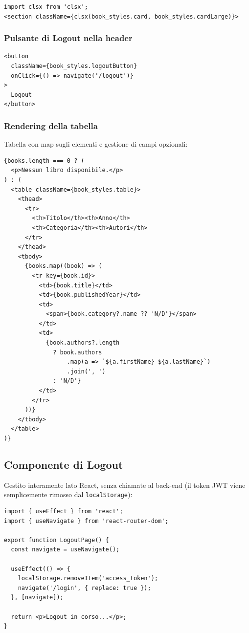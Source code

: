 \documentclass[11pt,a4paper]{article}
\begin{document}
\begin{lstlisting}[language=tsx]
import clsx from 'clsx';
<section className={clsx(book_styles.card, book_styles.cardLarge)}>
\end{lstlisting}

\subsubsection{Pulsante di Logout nella header}
\begin{lstlisting}[language=tsx]
<button
  className={book_styles.logoutButton}
  onClick={() => navigate('/logout')}
>
  Logout
</button>
\end{lstlisting}

\subsubsection{Rendering della tabella}
Tabella con map sugli elementi e gestione di campi opzionali:

\begin{lstlisting}[language=tsx]
{books.length === 0 ? (
  <p>Nessun libro disponibile.</p>
) : (
  <table className={book_styles.table}>
    <thead>
      <tr>
        <th>Titolo</th><th>Anno</th>
        <th>Categoria</th><th>Autori</th>
      </tr>
    </thead>
    <tbody>
      {books.map((book) => (
        <tr key={book.id}>
          <td>{book.title}</td>
          <td>{book.publishedYear}</td>
          <td>
            <span>{book.category?.name ?? 'N/D'}</span>
          </td>
          <td>
            {book.authors?.length
              ? book.authors
                  .map(a => `${a.firstName} ${a.lastName}`)
                  .join(', ')
              : 'N/D'}
          </td>
        </tr>
      ))}
    </tbody>
  </table>
)}
\end{lstlisting}

\subsection{Componente di Logout}

Gestito interamente lato React, senza chiamate al back-end (il token JWT viene semplicemente rimosso dal \texttt{localStorage}):

\begin{lstlisting}[language=tsx]
import { useEffect } from 'react';
import { useNavigate } from 'react-router-dom';

export function LogoutPage() {
  const navigate = useNavigate();

  useEffect(() => {
    localStorage.removeItem('access_token');
    navigate('/login', { replace: true });
  }, [navigate]);

  return <p>Logout in corso...</p>;
}
\end{lstlisting}
\end{document}

